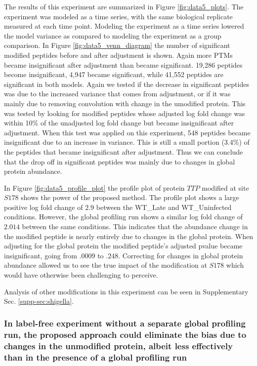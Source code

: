\documentclass[mcp]{article}
\numberwithin{table}{section}
\begin{document}
The results of this experiment are summarized in Figure \ref{fig:data5_plots}. The experiment was modeled as a time series, with the same biological replicate measured at each time point. Modeling the experiment as a time series lowered the model variance as compared to modeling the experiment as a group comparison. In Figure \ref{fig:data5_venn_diagram} the number of significant modified peptides before and after adjustment is shown. Again more PTMs became insignificant after adjustment than became significant. 19,286 peptides become insignificant, 4,947 became significant, while 41,552 peptides are significant in both models. Again we tested if the decrease in significant peptides was due to the increased variance that comes from adjustment, or if it was mainly due to removing convolution with change in the umodified protein. This was tested by looking for modified peptides whose adjusted log fold change was within 10\% of the unadjusted log fold change but became insignificant after adjustment. When this test was applied on this experiment, 548 peptides became insignificant due to an increase in variance. This is still a small portion (3.4\%) of the peptides that became insignificant after adjustment. Thus we can conclude that the drop off in significant peptides was mainly due to changes in global protein abundance.

In Figure \ref{fig:data5_profile_plot} the profile plot of protein $TTP$ modified at site $S178$ shows the power of the proposed method.  The profile plot shows a large positive log fold change of $2.9$ between the WT\_Late and WT\_Uninfected conditions. However, the global profiling run shows a similar log fold change of $2.014$ between the same conditions. This indicates that the abundance change in the modified peptide is nearly entirely due to changes in the global protein. When adjusting for the global protein the modified peptide's adjusted pvalue became insignificant, going from $.0009$ to $.248$. Correcting for changes in global protein abundance allowed us to see the true impact of the modification at $S178$ which would have otherwise been challenging to perceive.

Analysis of other modifications in this experiment can be seen in Supplementary Sec. \ref{supp-sec:shigella}.

\subsubsection*{In label-free experiment without a separate global profiling run, the proposed approach could eliminate the bias due to changes in the unmodified protein, albeit less effectively than in the presence of a global profiling run}
\end{document}
